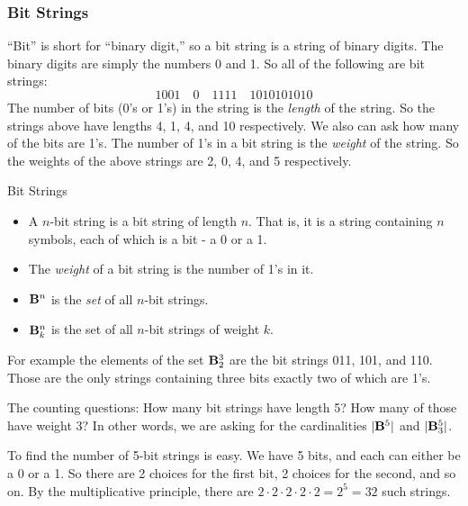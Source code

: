 \documentclass[12pt]{article}
\begin{document}
\subsubsection*{Bit Strings}

``Bit'' is short for ``binary digit,'' so a bit string is a string of binary digits.  The binary digits are simply the numbers 0 and 1.  So all of the following are bit strings:
\[1001 \quad 0 \quad 1111 \quad 1010101010\]
The number of bits (0's or 1's) in the string is the {\em length} of the string.  So the strings above have lengths 4, 1, 4, and 10 respectively.  We also can ask how many of the bits are 1's.  The number of 1's in a bit string is the {\em weight} of the string.  So the weights of the above strings are 2, 0, 4, and 5 respectively.

\begin{defbox}{Bit Strings}
  \begin{itemize}
    \item A $n$-bit string is a bit string of length $n$.  That is, it is a string containing $n$ symbols, each of which is a bit - a 0 or a 1.
    \item The {\em weight} of a bit string is the number of 1's in it.
    \item $\mathbf{B}^n$ is the {\em set} of all $n$-bit strings.
    \item $\mathbf{B}^n_k$ is the set of all $n$-bit strings of weight $k$.
  \end{itemize}
\end{defbox}

For example the elements of the set $\mathbf{B}^3_2$ are the bit strings 011, 101, and 110.  Those are the only strings containing three bits exactly two of which are 1's.

The counting questions: How many bit strings have length 5?  How many of those have weight 3?  In other words, we are asking for the cardinalities $|\mathbf{B}^5|$ and $|\mathbf{B}^5_3|$.  

To find the number of 5-bit strings is easy.  We have 5 bits, and each can either be a 0 or a 1.  So there are 2 choices for the first bit, 2 choices for the second, and so on.  By the multiplicative principle, there are $2 \cdot 2 \cdot 2\cdot 2 \cdot 2 = 2^5 = 32$ such strings.  
\end{document}
